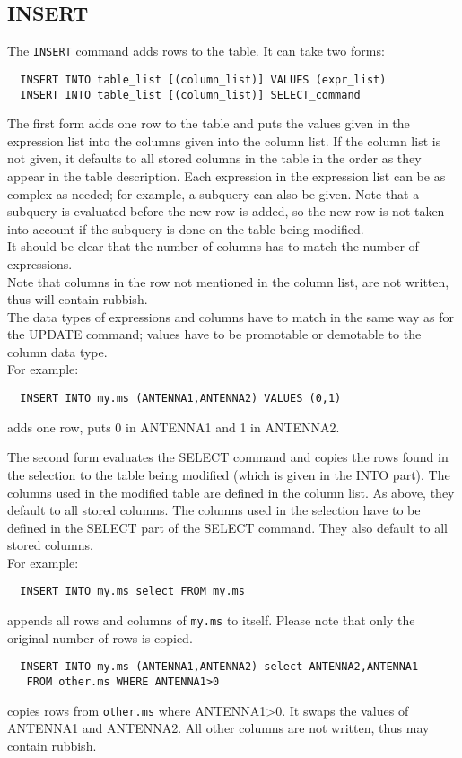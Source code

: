 \subsection{INSERT}
The \texttt{INSERT} command adds rows to the table. It can take two forms:
\begin{verbatim}
  INSERT INTO table_list [(column_list)] VALUES (expr_list)
  INSERT INTO table_list [(column_list)] SELECT_command
\end{verbatim}
The first form adds one row to the table and puts the values given in
the expression list into the columns given into the column list.
If the column list is not given, it defaults to all stored columns in
the table in the order as they appear in the table description.
Each expression in the expression list can be as complex as needed;
for example, a subquery can also be given. Note that a subquery is
evaluated before the new row is added, so the new row is not taken
into account if the subquery is done on the table being modified.
\\It should be clear that the number of columns has to match the
number of expressions.
\\Note that columns in the row not mentioned in the column list,
are not written, thus will contain rubbish.
\\The data types of expressions and columns have to match in the same way
as for the UPDATE command; values have to be promotable or demotable
to the column data type.
\\For example:
\begin{verbatim}
  INSERT INTO my.ms (ANTENNA1,ANTENNA2) VALUES (0,1)
\end{verbatim}
adds one row, puts 0 in ANTENNA1 and 1 in ANTENNA2.

The second form evaluates the SELECT command and copies the rows
found in the selection to the table being modified (which is given
in the INTO part).
The columns used in the modified table are defined in the column list.
As above, they default to all stored columns. The columns used in the
selection have to be defined in the SELECT part of the SELECT command.
They also default to all stored columns.
\\For example:
\begin{verbatim}
  INSERT INTO my.ms select FROM my.ms
\end{verbatim}
appends all rows and columns of \texttt{my.ms} to itself.
Please note that only the original number of rows is copied.
\begin{verbatim}
  INSERT INTO my.ms (ANTENNA1,ANTENNA2) select ANTENNA2,ANTENNA1
   FROM other.ms WHERE ANTENNA1>0
\end{verbatim}
copies rows from \texttt{other.ms} where ANTENNA1>0. It swaps the
values of ANTENNA1 and ANTENNA2. All other columns are not written,
thus may contain rubbish.

